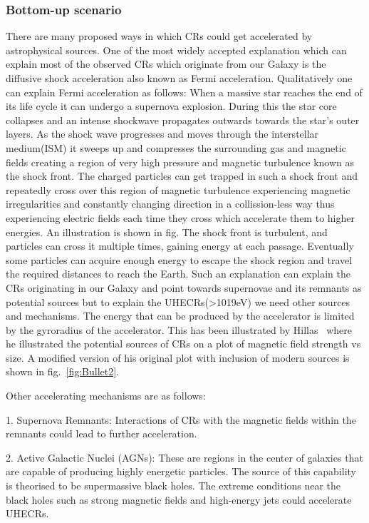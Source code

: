 \subsubsection{Bottom-up scenario}

There are many proposed ways in which CRs could get accelerated by astrophysical sources. One of the most widely accepted explanation which can explain most of the observed CRs which originate from our Galaxy is the diffusive shock acceleration also known as Fermi acceleration. Qualitatively one can explain Fermi acceleration as follows: When a massive star reaches the end of its life cycle it can undergo a supernova explosion. During this the star core collapses and an intense shockwave propagates outwards towards the star's outer layers. As the shock wave progresses and moves through the interstellar medium(ISM) it sweeps up and compresses the surrounding gas and magnetic fields creating a region of very high pressure and magnetic turbulence known as the shock front. The charged particles can get trapped in such a shock front and repeatedly cross over this region of magnetic turbulence experiencing magnetic irregularities and constantly changing direction in a collission-less way thus experiencing electric fields each time they cross which accelerate them to higher energies. An illustration is shown in fig. The shock front is turbulent, and particles can cross it multiple times, gaining energy at each passage. Eventually some particles can acquire enough energy to escape the shock region and travel the required distances to reach the Earth. Such an explanation can explain the CRs originating in our Galaxy and point towards supernovae and its remnants as potential sources but to explain the UHECRs(>1019eV) we need other sources and mechanisms. The energy that can be produced by the accelerator is limited by the gyroradius of the accelerator. This has been illustrated by Hillas~\cite{} where he illustrated the potential sources of CRs on a plot of magnetic field strength vs size. A modified version of his original plot with inclusion of modern sources is shown in fig.~\ref{fig:Bullet2}.   

Other accelerating mechanisms are as follows:


1. Supernova Remnants:  Interactions of CRs with the magnetic fields within the remnants could lead to further acceleration.

2. Active Galactic Nuclei (AGNs): These are regions in the center of galaxies that are capable of producing highly energetic particles. The source of this capability is theorised to be supermassive black holes. The extreme conditions near the black holes such as strong magnetic fields and high-energy jets could accelerate UHECRs.

